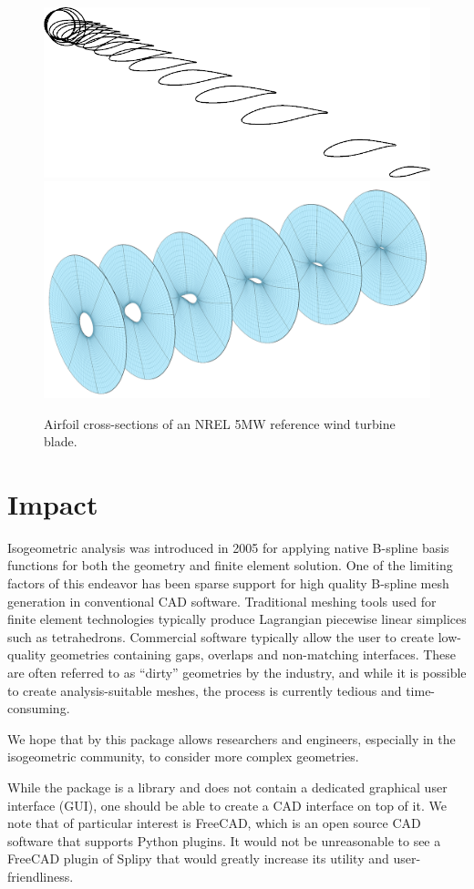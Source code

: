 \documentclass[preprint,12pt, a4paper]{elsarticle}
\begin{document}
\begin{figure}
  \begin{center}
    \includegraphics[width=.4\textwidth]{figs/airfoils}
    \includegraphics[width=.5\textwidth]{figs/crossecs2}
  \end{center}
  \caption{Airfoil cross-sections of an NREL 5MW reference wind turbine blade.}
  \label{fig:airfoils}
\end{figure}

\section{Impact}
\label{sec:impact}

Isogeometric analysis was introduced in 2005 \cite{hughes2005iac} for applying native B-spline basis functions for both the geometry and finite element solution.
One of the limiting factors of this endeavor has been sparse support for high quality B-spline mesh generation in conventional CAD software.
Traditional meshing tools used for finite element technologies typically produce Lagrangian piecewise linear simplices such as tetrahedrons.
Commercial software typically allow the user to create low-quality geometries containing gaps, overlaps and non-matching interfaces.
These are often referred to as ``dirty'' geometries by the industry, and while it is possible to create analysis-suitable meshes, the process is currently tedious and time-consuming.

We hope that by this package allows researchers and engineers, especially in the isogeometric community, to consider more complex geometries.

While the package is a library and does not contain a dedicated graphical user interface (GUI), one should be able to create a CAD interface on top of it.
We note that of particular interest is FreeCAD, which is an open source CAD software that supports Python plugins.
It would not be unreasonable to see a FreeCAD plugin of Splipy that would greatly increase its utility and user-friendliness.
\end{document}
